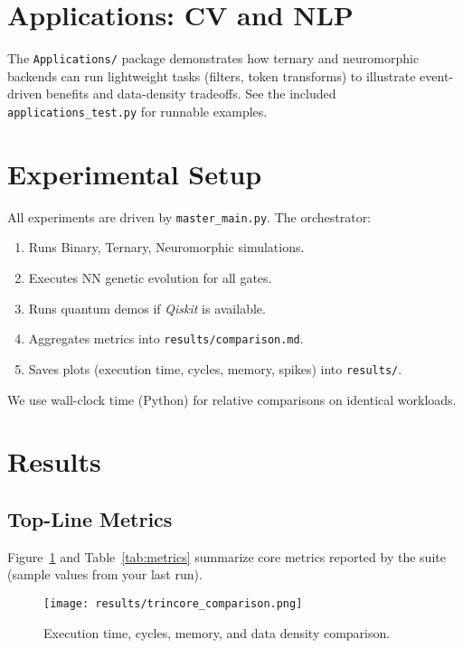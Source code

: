 \documentclass[11pt,a4paper]{article}
\newcommand{\code}[1]{\texttt{#1}}
\begin{document}
\section{Applications: CV and NLP}
\label{sec:apps}
The \code{Applications/} package demonstrates how ternary and neuromorphic
backends can run lightweight tasks (filters, token transforms) to illustrate
event-driven benefits and data-density tradeoffs. See the included
\code{applications\_test.py} for runnable examples.

\section{Experimental Setup}
\label{sec:exp}
All experiments are driven by \code{master\_main.py}. The orchestrator:
\begin{enumerate}[leftmargin=1.25em]
  \item Runs Binary, Ternary, Neuromorphic simulations.
  \item Executes NN genetic evolution for all gates.
  \item Runs quantum demos if \emph{Qiskit} is available.
  \item Aggregates metrics into \code{results/comparison.md}.
  \item Saves plots (execution time, cycles, memory, spikes) into \code{results/}.
\end{enumerate}
We use wall-clock time (Python) for relative comparisons on identical workloads.

\section{Results}
\label{sec:results}
\subsection{Top-Line Metrics}
Figure~\ref{fig:comp} and Table~\ref{tab:metrics} summarize core metrics
reported by the suite (sample values from your last run).

\begin{figure}[h]
\centering
\texttt{[image: results/trincore\_comparison.png]}
\caption{Execution time, cycles, memory, and data density comparison.}
\label{fig:comp}
\end{figure}
\end{document}
